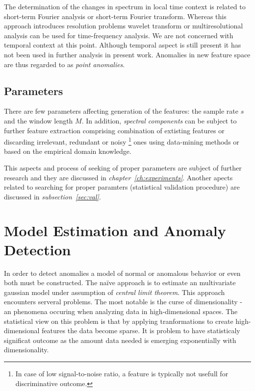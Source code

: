 The determination of the changes in spectrum in local time context is related to short-term
Fourier analysis or short-term Fourier transform. Whereas this approach introduces
resolution problems wavelet transform or multiresolutional analysis can be used for
time-frequency analysis. We are not concerned with temporal context at this point.
Although temporal aspect is still present it has not been used in further analysis 
in present work. Anomalies in new feature space are thus regarded to as \emph{point anomalies}. 

\subsection{Parameters}

There are few parameters affecting generation of the  features: %
the sample rate $s$ and the window length $M$. 
In addition, \emph{spectral components} can be subject to further feature extraction 
comprising combination of extisting features or discarding irrelevant, 
redundant  or noisy%
\footnote{
    In case of low signal-to-noise ratio, a feature is typically not usefull 
    for discriminative outcome.
} %
ones using data-mining methods or based on the empirical domain knowledge.

This aspects and process of seeking of proper parameters are subject of further 
research and they are discussed in \emph{chapter~\ref{ch:experiments}}. 
Another apects related to searching for proper paramters (statistical 
validation procedure) are discussed in \emph{subsection~\ref{sec:val}}.

\section{Model Estimation and Anomaly Detection}

In order to detect anomalies a model of normal or anomalous behavior or even both
must be constructed. The na\"ive approach is to estimate an multivariate gaussian 
model under assumption of \emph{central limit theorem}. This approach encounters 
serveral problems. The most notable is the curse of dimensionality - 
an phenomena occuring when analyzing data in high-dimensional spaces.
The statistical view on this problem is that by applying tranformations 
to create high-dimensional features the data become sparse. It is problem to 
have statisticaly significat outcome as the amount data needed is emerging
exponentially with dimensionality. 

